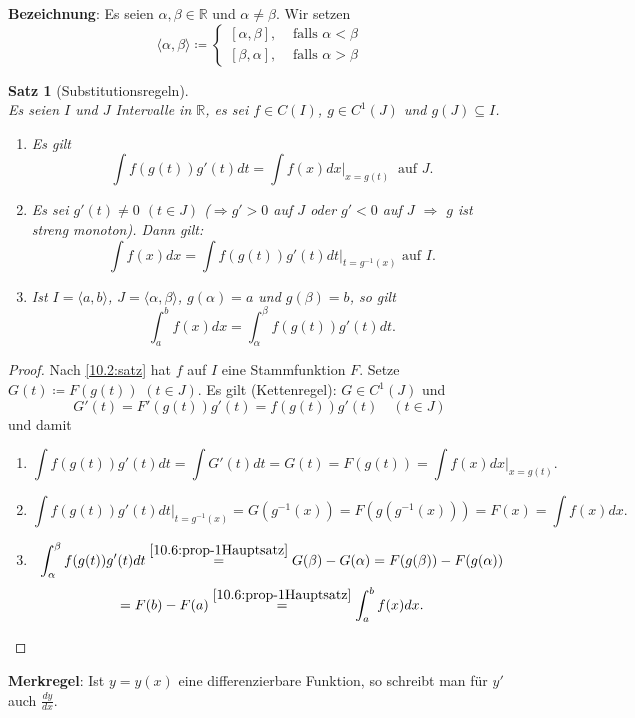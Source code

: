 \documentclass[12pt]{extreport} %
\newcommand{\R}{\mathbb{R}}
\theoremstyle{named}
\theoremstyle{itshape}
\newtheorem{satz}[unnamedtheorem]{Satz}
\theoremstyle{normal}
\begin{document}
{\textbf{Bezeichnung}: Es seien $\alpha, \beta \in \R$ und $\alpha \neq \beta$. Wir setzen
	$$ \langle \alpha, \beta \rangle \coloneqq \begin{cases} [\alpha, \beta], & \text{ falls } \alpha < \beta \\ [\beta, \alpha], & \text{ falls } \alpha > \beta \end{cases} $$

\begin{satz}[Substitutionsregeln] \label{10.14:prop-Substitutionsregeln} ~\\
	Es seien $I$ und $J$ Intervalle in $\R$, es sei $f \in C(I)$, $g \in C^{1}(J)$ und $g(J) \subseteq I$. 
	\begin{enumerate}
		\item Es gilt $$\int f(g(t)) g'(t) dt = \int f(x) dx \Big|_{x = g(t)} ~ \text{ auf } J.$$
		\item Es sei $g'(t) \neq 0$ $(t \in J)$ ($\Rightarrow g' > 0$ auf $J$ oder $g' < 0$ auf $J$ $\Rightarrow$ $g$ ist streng monoton). Dann gilt:
			$$ \int f(x) dx = \int f(g(t)) g'(t) dt \Big|_{t=g^{-1}(x)} \text{ auf } I. $$
		\item Ist $I = \langle a, b \rangle$, $J = \langle \alpha, \beta \rangle$, $g(\alpha) = a$ und $g(\beta) = b$, so gilt
			$$ \int_{a}^{b} f(x) dx = \int_{\alpha}^{\beta} f(g(t)) g'(t) dt. $$
	\end{enumerate}
\end{satz}

\begin{proof}
	Nach \ref{10.2:satz} hat $f$ auf $I$ eine Stammfunktion $F$. Setze $G(t) \coloneqq F(g(t))$ $(t \in J)$. Es gilt (Kettenregel): $G \in C^{1}(J)$ und
	$$ G'(t) = F'(g(t)) g'(t) = f(g(t)) g'(t) \quad (t \in J)$$
	und damit
	\begin{enumerate}
		\item $$\int f(g(t)) g'(t) dt = \int G'(t) dt = G(t) = F(g(t)) = \int f(x) dx \Big|_{x=g(t)}.$$
		\item $$\int f(g(t)) g'(t) dt\Big|_{t = g^{-1}(x)} = G(g^{-1}(x)) = F(g(g^{-1}(x))) = F(x)=\int f(x) dx .$$
		\item $$\int_{\alpha}^{\beta} f(g(t)) g'(t) dt \overset{\ref{10.6:prop-1Hauptsatz}}{=} G(\beta) - G(\alpha) = F(g(\beta)) - F(g(\alpha))$$ 
		$$ = F(b) - F(a) \overset{\ref{10.6:prop-1Hauptsatz}}{=} \int_{a}^{b} f(x) dx. $$ 
	\end{enumerate}
\end{proof}


\textbf{Merkregel}:  Ist $y = y(x)$ eine differenzierbare Funktion, so schreibt man für $y'$ auch $\frac{dy}{dx}$.

}
\end{document}
